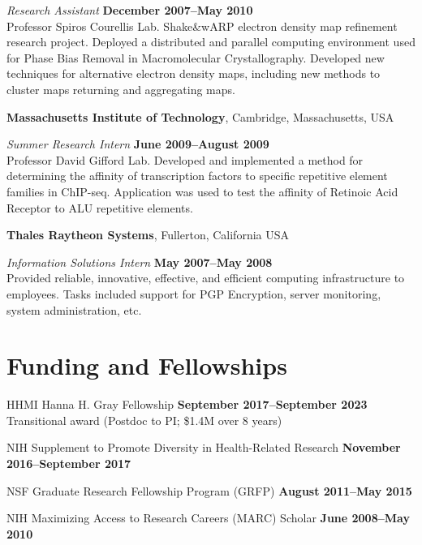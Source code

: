\documentclass[11pt,notitlepage]{article} %
\begin{document}
{\em Research Assistant} \hfill {\bf December 2007--May 2010}\\
Professor Spiros Courellis Lab. Shake\&wARP electron density map refinement
research project. Deployed a distributed and parallel computing environment used
for Phase Bias Removal in Macromolecular Crystallography. Developed new
techniques for alternative electron density maps, including new methods to
cluster maps returning and aggregating maps.

\bigskip

{\bf Massachusetts Institute of Technology}, Cambridge, Massachusetts,
USA

{\em Summer Research Intern} \hfill {\bf June 2009--August 2009}\\
Professor David Gifford Lab. Developed and implemented a method for
determining the affinity of transcription factors to specific repetitive element
families in ChIP-seq. Application was used to test the affinity of Retinoic
Acid Receptor to ALU repetitive elements.

\bigskip

{\bf Thales Raytheon Systems}, Fullerton, California USA

{\em Information Solutions Intern} \hfill {\bf May 2007--May 2008}\\
Provided reliable, innovative, effective, and efficient computing infrastructure
to employees. Tasks included support for PGP Encryption, server monitoring,
system administration, etc.



\bigskip
\section*{Funding and Fellowships}
\medskip

HHMI Hanna H. Gray Fellowship \hfill {\bf September 2017--September 2023}\\
Transitional award (Postdoc to PI; \$1.4M over 8 years)

\medskip

NIH Supplement to Promote Diversity in Health-Related Research \hfill {\bf November 2016--September 2017}

\medskip

NSF Graduate Research Fellowship Program (GRFP)
\hfill {\bf August 2011--May 2015}

\medskip

NIH Maximizing Access to Research Careers (MARC) Scholar \hfill {\bf
  June 2008--May 2010}
\end{document}
